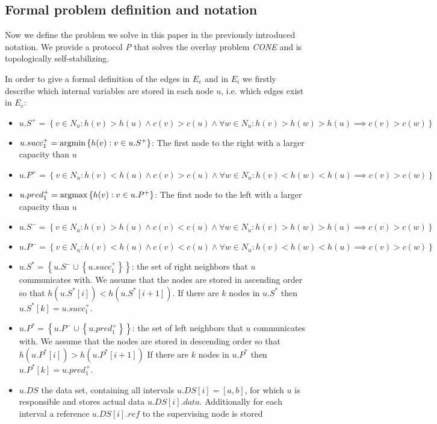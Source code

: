 \documentclass[11pt]{article}
\def\argmin{{\rm argmin}}
\def\argmax{{\rm argmax}}
\begin{document}
\subsection{Formal problem definition and notation}\label{problem}



Now we define the problem we solve in this paper in the previously introduced notation. We provide a protocol \emph{P} that solves the overlay problem \emph{CONE} and is topologically self-stabilizing.



In order to give a formal definition of the edges in $E_e$ and in $E_i$ we firstly describe which internal variables are stored in each node $u$, i.e. which edges exist in $E_e$:

\begin{itemize}\itemsep0.1pt

\item $u.S^+=\left\{v\in N_u: h(v)>h(u) \wedge c(v)>c(u) \wedge \forall w\in N_u: h(v)>h(w)>h(u) \implies c(v)>c(w)\right\}$

\item $u.succ^+_1=\argmin \left\{h(v): v \in u.S^+ \right\}$: The first node to the right with a larger capacity than $u$

\item $u.P^+=\left\{v\in N_u: h(v)<h(u) \wedge c(v)>c(u) \wedge \forall w\in N_u: h(v)<h(w)<h(u) \implies c(v)>c(w)\right\}$

\item $u.pred^+_1=\argmax \left\{h(v): v \in u.P^+\right\}$: The first node to the left with a larger capacity than $u$

\item $u.S^-=\left\{v\in N_u: h(v)>h(u) \wedge c(v)<c(u) \wedge \forall w\in N_u: h(v)>h(w)>h(u) \implies c(v)>c(w)\right\}$

\item $u.P^-=\left\{v\in N_u: h(v)<h(u) \wedge c(v)<c(u) \wedge \forall w\in N_u: h(v)<h(w)<h(u) \implies c(v)>c(w)\right\}$

\item $u.S^*=\left\{u.S^- \cup \left\{u.succ^+_1\right\}\right\}$: the set of right neighbors that $u$ communicates with. We assume that the nodes are stored in ascending order so that $h(u.S^*[i])<h(u.S^*[i+1])$. If there are $k$ nodes in $u.S^*$ then $u.S^*[k]=u.succ^+_1$. 

\item $u.P^*=\left\{u.P^- \cup \left\{u.pred^+_1\right\}\right\}$: the set of left neighbors that $u$ communicates with. We assume that the nodes are stored in descending order so that $h(u.P^*[i])>h(u.P^*[i+1])$ If there are $k$ nodes in $u.P^*$ then $u.P^*[k]=u.pred^+_1$.

\item $u.DS$ the data set, containing all intervals $u.DS[i]=[a,b]$, for which $u$ is responsible and stores actual data $u.DS[i].data$.  
Additionally for each interval a reference $u.DS[i].ref$ to the supervising node is stored
\end{itemize}
\end{document}

